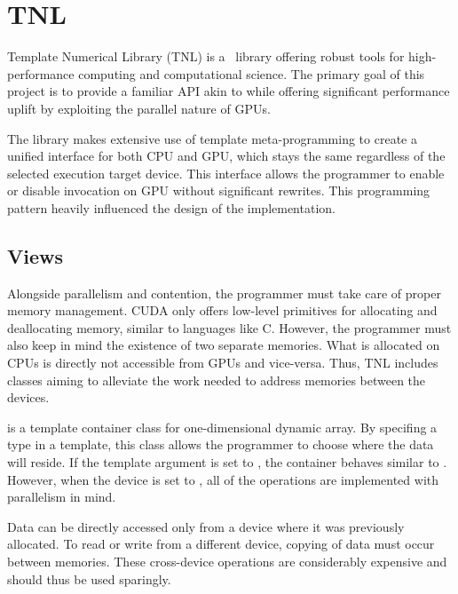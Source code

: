 \section{TNL}

Template Numerical Library (TNL) is a \CC\ library offering robust tools for high-performance computing and computational science. The primary goal of this project is to provide a familiar API akin to  while offering significant performance uplift by exploiting the parallel nature of GPUs.

The library makes extensive use of template meta-programming to create a unified interface for both CPU and GPU, which stays the same regardless of the selected execution target device. This interface allows the programmer to enable or disable invocation on GPU without significant rewrites. This programming pattern heavily influenced the design of the implementation.

\subsection{Views}

Alongside parallelism and contention, the programmer must take care of proper memory management. CUDA only offers low-level primitives for allocating and deallocating memory, similar to languages like C. However, the programmer must also keep in mind the existence of two separate memories. What is allocated on CPUs is directly not accessible from GPUs and vice-versa. Thus, TNL includes classes aiming to alleviate the work needed to address memories between the devices.

 is a template container class for one-dimensional dynamic array. By specifing a type in a template, this class allows the programmer to choose where the data will reside. If the template argument is set to , the container behaves similar to . However, when the device is set to , all of the operations are implemented with parallelism in mind.

Data can be directly accessed only from a device where it was previously allocated. To read or write from a different device, copying of data must occur between memories. These cross-device operations are considerably expensive and should thus be used sparingly.

